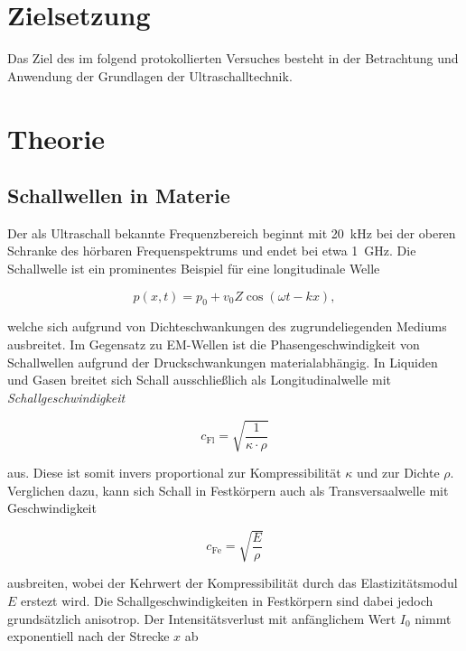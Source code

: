 %

%

\section{Zielsetzung}

Das Ziel des im folgend protokollierten Versuches besteht in der Betrachtung und Anwendung der Grundlagen der 
Ultraschalltechnik.

\section{Theorie}
\label{sec:Theorie}

\subsection{Schallwellen in Materie}

\noindent Der als Ultraschall bekannte Frequenzbereich beginnt mit \qty{20}{\kilo\hertz} bei der oberen Schranke des hörbaren 
Frequenspektrums und endet bei etwa \qty{1}{\giga\hertz}. Die Schallwelle ist ein prominentes Beispiel für eine longitudinale 
Welle 

\begin{equation*}
    p\left(x,t\right) = p_0 + v_0Z\cos\left(\omega{}t - kx\right),
\end{equation*}

\noindent welche sich aufgrund von Dichteschwankungen des zugrundeliegenden Mediums ausbreitet. Im Gegensatz zu EM-Wellen ist 
die Phasengeschwindigkeit von Schallwellen aufgrund der Druckschwankungen materialabhängig. In Liquiden und Gasen breitet sich 
Schall ausschließlich als Longitudinalwelle mit \emph{Schallgeschwindigkeit}

\begin{equation*}
    c_\text{Fl} = \sqrt{\frac{1}{\kappa\cdot\rho}}
\end{equation*}

aus. Diese ist somit invers proportional zur Kompressibilität $\kappa$ und zur Dichte $\rho$. Verglichen dazu, kann sich Schall 
in Festkörpern auch als Transversaalwelle mit Geschwindigkeit 

\begin{equation*}
        c_\text{Fe} = \sqrt{\frac{E}{\rho}}
\end{equation*}

\noindent ausbreiten, wobei der Kehrwert der Kompressibilität durch das Elastizitätsmodul $E$ erstezt wird. Die Schallgeschwindigkeiten
in Festkörpern sind dabei jedoch grundsätzlich anisotrop. Der Intensitätsverlust mit anfänglichem Wert $I_0$ nimmt 
exponentiell nach der Strecke $x$ ab 

